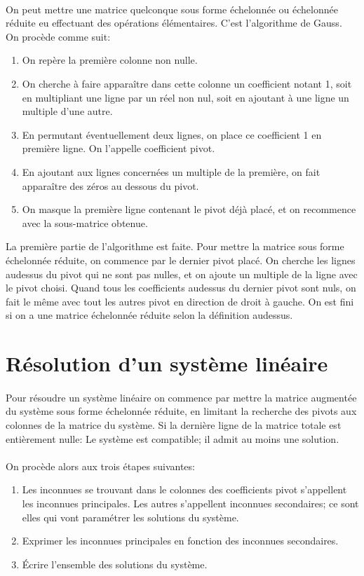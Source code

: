 \paragraph{} On peut mettre une matrice quelconque sous forme échelonnée ou échelonnée réduite eu effectuant des opérations élémentaires. C'est l'algorithme de Gauss. \\
On procède comme suit:
\begin{enumerate}
  \item On repère la première colonne non nulle.
  \item On cherche à faire apparaître dans cette colonne un coefficient notant 1, soit en multipliant une ligne par un réel non nul, soit en ajoutant à une ligne un multiple d'une autre.
  \item En permutant éventuellement deux lignes, on place ce coefficient 1 en première ligne. On l'appelle coefficient pivot.
  \item En ajoutant aux lignes concernées un multiple de la première, on fait apparaître des zéros au dessous du pivot. 
  \item On masque la première ligne contenant le pivot déjà placé, et on recommence avec la sous-matrice obtenue.
\end{enumerate}
La première partie de l'algorithme est faite. Pour mettre la matrice sous forme échelonnée réduite, on commence par le dernier pivot placé. On cherche les lignes audessus du pivot qui ne sont pas nulles, et on ajoute un multiple de la ligne avec le pivot choisi. Quand tous les coefficients audessus du dernier pivot sont nuls, on fait le même avec tout les autres pivot en direction de droit à gauche. On est fini si on a une matrice échelonnée réduite selon la définition audessus.

%
%
\section{Résolution d'un système linéaire}
%
%
\paragraph{} Pour résoudre un système linéaire on commence par mettre la matrice augmentée du système sous forme échelonnée réduite, en limitant la recherche des pivots aux colonnes de la matrice du système.
Si la dernière ligne de la matrice totale est entièrement nulle: Le système est compatible; il admit au moins une solution.
\paragraph{}On procède alors aux trois étapes suivantes:
\begin{enumerate}
  \item Les inconnues se trouvant dans le colonnes des coefficients pivot s'appellent les inconnues principales. Les autres s'appellent inconnues secondaires; ce sont elles qui vont paramétrer les solutions du système.
  \item Exprimer les inconnues principales en fonction des inconnues secondaires.
  \item Écrire l'ensemble des solutions du système.
\end{enumerate}
